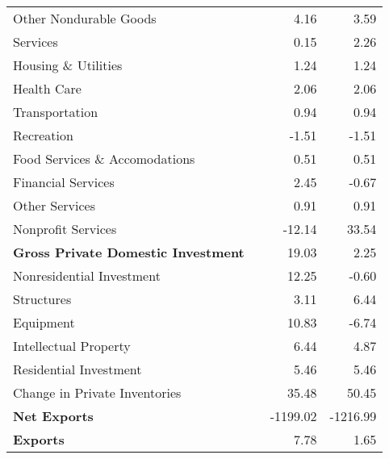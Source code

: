 \documentclass[11pt, letterpaper]{article}\usepackage[]{graphicx}\usepackage[]{color}
\begin{document}
\begin{table}[H]
\begin{tabular}{lrrr}
  \hspace{24mm}  Other Nondurable Goods &  & 4.16 & 3.59 \\ 
  \hspace{8mm}  Services &  & 0.15 & 2.26 \\ 
  \hspace{16mm}  Housing \& Utilities &  & 1.24 & 1.24 \\ 
  \hspace{16mm}  Health Care &  & 2.06 & 2.06 \\ 
  \hspace{16mm}  Transportation &  & 0.94 & 0.94 \\ 
  \hspace{16mm}  Recreation &  & -1.51 & -1.51 \\ 
  \hspace{16mm}  Food Services \& Accomodations &  & 0.51 & 0.51 \\ 
  \hspace{16mm}  Financial Services &  & 2.45 & -0.67 \\ 
  \hspace{16mm}  Other Services &  & 0.91 & 0.91 \\ 
  \hspace{16mm}  Nonprofit Services &  & -12.14 & 33.54 \\ 
  \hspace{0mm} \textbf{Gross Private Domestic Investment} &  & 19.03 & 2.25 \\ 
  \hspace{8mm}  Nonresidential Investment &  & 12.25 & -0.60 \\ 
  \hspace{16mm}  Structures &  & 3.11 & 6.44 \\ 
  \hspace{16mm}  Equipment &  & 10.83 & -6.74 \\ 
  \hspace{16mm}  Intellectual Property &  & 6.44 & 4.87 \\ 
  \hspace{8mm}  Residential Investment &  & 5.46 & 5.46 \\ 
  \hspace{8mm}  Change in Private Inventories &  & 35.48 & 50.45 \\ 
  \hspace{0mm} \textbf{Net Exports} &  & -1199.02 & -1216.99 \\ 
  \hspace{0mm} \textbf{Exports} &  & 7.78 & 1.65 \\ 

\end{tabular}
\end{table}
\end{document}

